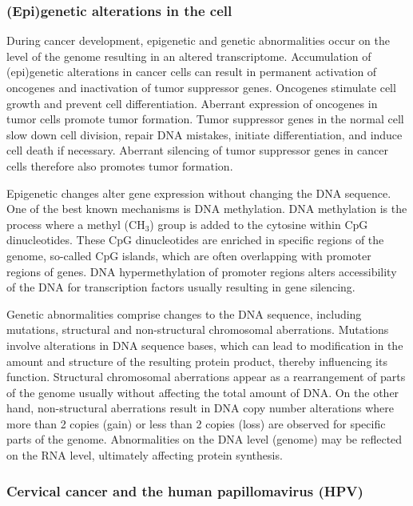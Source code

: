 \subsubsection{(Epi)genetic alterations in the cell}

During cancer development, epigenetic and genetic abnormalities occur on the level of the genome resulting in an altered transcriptome. Accumulation of (epi)genetic alterations in cancer cells can result in permanent activation of oncogenes and inactivation of tumor suppressor genes. Oncogenes stimulate cell growth and prevent cell differentiation. Aberrant expression of oncogenes in tumor cells promote tumor formation. Tumor suppressor genes in the normal cell slow down cell division, repair DNA mistakes, initiate differentiation, and induce cell death if necessary. Aberrant silencing of tumor suppressor genes in cancer cells therefore also promotes tumor formation. 

Epigenetic changes alter gene expression without changing the DNA sequence. One of the best known mechanisms is DNA methylation. DNA methylation is the process where a methyl ($\textrm{CH}_3$) group is added to the cytosine within CpG dinucleotides. These CpG dinucleotides are enriched in specific regions of the genome, so-called CpG islands, which are often overlapping with promoter regions of genes. DNA hypermethylation of promoter regions alters accessibility of the DNA for transcription factors usually resulting in gene silencing. 

  Genetic abnormalities comprise changes to the DNA sequence, including mutations, structural and non-structural chromosomal aberrations. Mutations involve alterations in DNA sequence bases, which can lead to modification in the amount and structure of the resulting protein product, thereby influencing its function. Structural chromosomal aberrations appear as a rearrangement of parts of the genome usually without affecting the total amount of DNA. On the other hand, non-structural aberrations result in DNA copy number alterations where more than 2 copies (gain) or less than 2 copies (loss) are observed for specific parts of the genome. Abnormalities on the DNA level (genome) may be reflected on the RNA level, ultimately affecting protein synthesis. 

\subsubsection{Cervical cancer and the human papillomavirus (HPV)}

